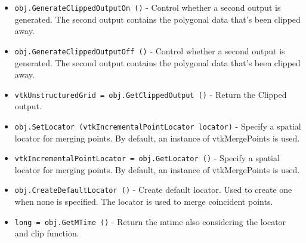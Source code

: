 \begin{itemize}
\item  \verb|obj.GenerateClippedOutputOn ()| -  Control whether a second output is generated. The second output
 contains the polygonal data that's been clipped away.

\item  \verb|obj.GenerateClippedOutputOff ()| -  Control whether a second output is generated. The second output
 contains the polygonal data that's been clipped away.

\item  \verb|vtkUnstructuredGrid = obj.GetClippedOutput ()| -  Return the Clipped output.

\item  \verb|obj.SetLocator (vtkIncrementalPointLocator locator)| -  Specify a spatial locator for merging points. By default, an
 instance of vtkMergePoints is used.

\item  \verb|vtkIncrementalPointLocator = obj.GetLocator ()| -  Specify a spatial locator for merging points. By default, an
 instance of vtkMergePoints is used.

\item  \verb|obj.CreateDefaultLocator ()| -  Create default locator. Used to create one when none is specified. The 
 locator is used to merge coincident points.

\item  \verb|long = obj.GetMTime ()| -  Return the mtime also considering the locator and clip function.

\end{itemize}
